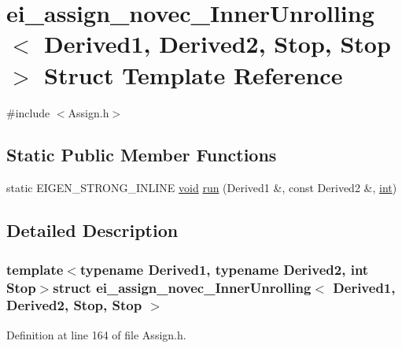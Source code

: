 \hypertarget{structei__assign__novec___inner_unrolling_3_01_derived1_00_01_derived2_00_01_stop_00_01_stop_01_4}{\section{ei\-\_\-assign\-\_\-novec\-\_\-\-Inner\-Unrolling$<$ Derived1, Derived2, Stop, Stop $>$ Struct Template Reference}
\label{structei__assign__novec___inner_unrolling_3_01_derived1_00_01_derived2_00_01_stop_00_01_stop_01_4}
}


{\ttfamily \#include $<$Assign.\-h$>$}

\subsection*{Static Public Member Functions}
\begin{DoxyCompactItemize}
\item 
static E\-I\-G\-E\-N\-\_\-\-S\-T\-R\-O\-N\-G\-\_\-\-I\-N\-L\-I\-N\-E \hyperlink{group___u_a_v_objects_plugin_ga444cf2ff3f0ecbe028adce838d373f5c}{void} \hyperlink{structei__assign__novec___inner_unrolling_3_01_derived1_00_01_derived2_00_01_stop_00_01_stop_01_4_ab825fd8cb37f02ce2d027c4dac73d6b3}{run} (Derived1 \&, const Derived2 \&, \hyperlink{ioapi_8h_a787fa3cf048117ba7123753c1e74fcd6}{int})
\end{DoxyCompactItemize}


\subsection{Detailed Description}
\subsubsection*{template$<$typename Derived1, typename Derived2, int Stop$>$struct ei\-\_\-assign\-\_\-novec\-\_\-\-Inner\-Unrolling$<$ Derived1, Derived2, Stop, Stop $>$}



Definition at line 164 of file Assign.\-h.



